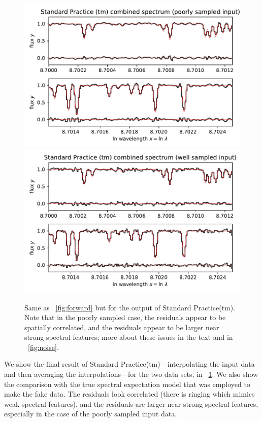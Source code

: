 \documentclass[modern]{aastex631}
\newlength{\figurewidth}
\begin{document}
\begin{figure}[t!]
    \begin{mdframed}\begin{center}
    \includegraphics[width=\figurewidth]{notebooks/standard1.pdf}\\
    \includegraphics[width=\figurewidth]{notebooks/standard2.pdf}
    \end{center}
    \caption{Same as \figurename~\ref{fig:forward} but for the output of Standard Practice(tm). Note that in the poorly sampled case, the residuals appear to be spatially correlated, and the residuals appear to be larger near strong spectral features; more about these issues in the text and in \figurename~\ref{fig:noise}.\label{fig:standard}}
    \end{mdframed}
\end{figure}
We show the final result of Standard Practice(tm)---interpolating the input data and then averaging the interpolations---for the two data sets, in \figurename~\ref{fig:standard}.
We also show the comparison with the true spectral expectation model that was employed to make the fake data.
The residuals look correlated (there is ringing which mimics weak spectral features), and the residuals are larger near strong spectral features, especially in the case of the poorly sampled input data.
\end{document}
